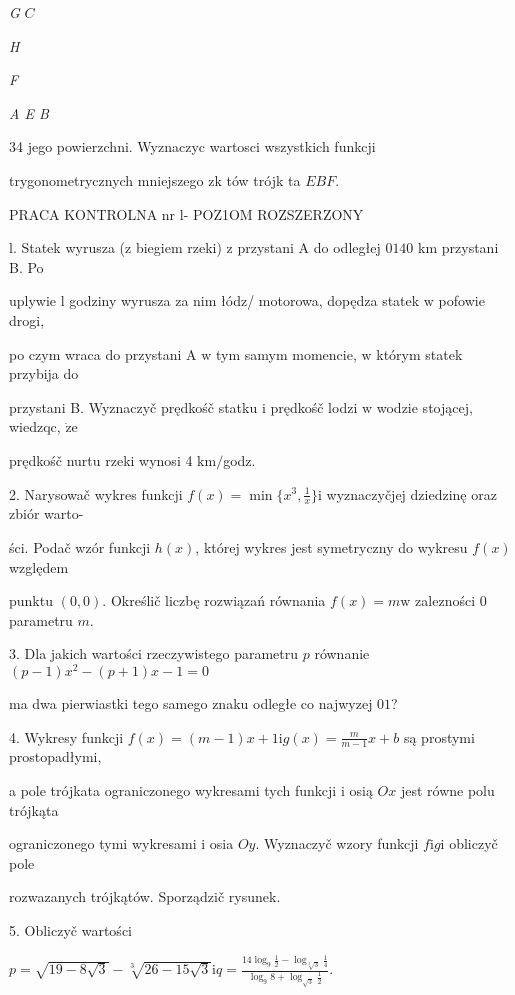 \documentclass[a4paper,12pt]{article}
\begin{document}
{\it G} $C$

{\it H}

{\it F}

{\it A E  B}

34 jego powierzchni. Wyznaczyc wartosci wszystkich funkcji

trygonometrycznych mniejszego $\mathrm{z}\mathrm{k}$ tów trójk ta $EBF.$




PRACA KONTROLNA nr l- POZ1OM ROZSZERZONY

l. Statek wyrusza ($\mathrm{z}$ biegiem rzeki) $\mathrm{z}$ przystani A do odległej $0 140$ km przystani B. Po

uplywie l godziny wyrusza za nim łódz/ motorowa, dopędza statek $\mathrm{w}$ pofowie drogi,

po czym wraca do przystani A $\mathrm{w}$ tym samym momencie, $\mathrm{w}$ którym statek przybija do

przystani B. Wyznaczyč prędkośč statku $\mathrm{i}$ prędkośč lodzi $\mathrm{w}$ wodzie stojącej, wiedzqc, $\dot{\mathrm{z}}\mathrm{e}$

prędkośč nurtu rzeki wynosi 4 $\mathrm{k}\mathrm{m}/$godz.

2. Narysowač wykres funkcji $f(x)=\displaystyle \min\{x^{3},\frac{1}{x}\}\mathrm{i}$ wyznaczyčjej dziedzinę oraz zbiór warto-

ści. Podač wzór funkcji $h(x)$, której wykres jest symetryczny do wykresu $f(x)$ względem

punktu $(0,0)$. Określič liczbę rozwiązań równania $f(x)=m\mathrm{w}$ zalezności $0$ parametru $m.$

3. Dla jakich wartości rzeczywistego parametru $p$ równanie $(p-1)x^{2}-(p+1)x-1=0$

ma dwa pierwiastki tego samego znaku odległe co najwyzej $01$?

4. Wykresy funkcji $f(x)=(m-1)x+1\displaystyle \mathrm{i}g(x)=\frac{m}{m-1}x+b$ są prostymi prostopadłymi,

a pole trójkata ograniczonego wykresami tych funkcji $\mathrm{i}$ osią $Ox$ jest równe polu trójkąta

ograniczonego tymi wykresami $\mathrm{i}$ osia $Oy$. Wyznaczyč wzory funkcji $f\mathrm{i}g\mathrm{i}$ obliczyč pole

rozwazanych trójkątów. Sporządzič rysunek.

5. Obliczyč wartości

$p=\displaystyle \sqrt{19-8\sqrt{3}}-\sqrt[3]{26-15\sqrt{3}}\mathrm{i}q=\frac{14\log_{9}\frac{1}{2}-\log_{\sqrt[3]{3}}\frac{1}{4}}{\log_{9}8+\log_{\sqrt{3}}\frac{1}{2}}.$
\end{document}

